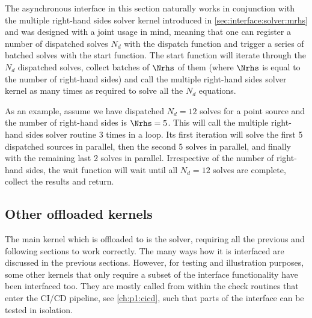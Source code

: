 The asynchronous interface in this section naturally works in conjunction with the multiple right-hand sides solver kernel introduced in \cref{sec:interface:solver:mrhs} and was designed with a joint usage in mind, meaning that one can register a number of dispatched solves $N_d$ with the dispatch function and trigger a series of batched solves with the start function.
The start function will iterate through the $N_d$ dispatched solves, collect batches of $\Nrhs$ of them (where $\Nrhs$ is equal to the number of right-hand sides) and call the multiple right-hand sides solver kernel as many times as required to solve all the $N_d$ equations. %

As an example, assume we have dispatched $N_d=12$ solves for a point source and the number of right-hand sides is $\Nrhs=5$.
This will call the multiple right-hand sides solver routine \num{3} times in a loop.
Its first iteration will solve the first \num{5} dispatched sources in parallel, then the second \num{5} solves in parallel, and finally with the remaining last \num{2} solves in parallel.
Irrespective of the number of right-hand sides, the wait function will wait until all $N_d=12$ solves are complete, collect the results and return.

\subsection{Other offloaded kernels}

The main kernel which is offloaded to \quda is the solver, requiring all the previous and following sections to work correctly.
The many ways how it is interfaced are discussed in the previous sections.
However, for testing and illustration purposes, some other kernels that only require a subset of the interface functionality have been interfaced too.
They are mostly called from within the check routines that enter the CI/CD pipeline, see \cref{ch:p1:cicd}, such that parts of the interface can be tested in isolation.

